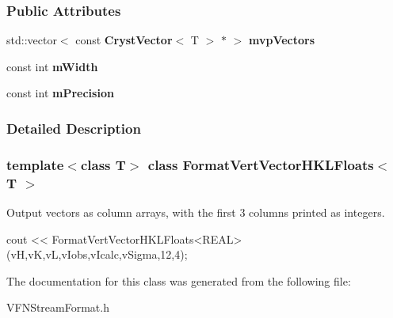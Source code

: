 \subsubsection*{Public Attributes}
\begin{DoxyCompactItemize}
\item 
std::vector$<$ const {\bf CrystVector}$<$ T $>$ $\ast$ $>$ {\bfseries mvpVectors}\label{a00033_adf1d4ac745168890122eb8258a15d2c7}

\item 
const int {\bfseries mWidth}\label{a00033_a47d65c09249a2efaacfc37c490f25115}

\item 
const int {\bfseries mPrecision}\label{a00033_a82aa77621492dcd761a755c9d707cb9e}

\end{DoxyCompactItemize}


\subsubsection{Detailed Description}
\subsubsection*{template$<$class T$>$ class FormatVertVectorHKLFloats$<$ T $>$}

Output vectors as column arrays, with the first 3 columns printed as integers. 
\begin{DoxyCode}
 cout << FormatVertVectorHKLFloats<REAL>(vH,vK,vL,vIobs,vIcalc,vSigma,12,4);
\end{DoxyCode}
 

The documentation for this class was generated from the following file:\begin{DoxyCompactItemize}
\item 
VFNStreamFormat.h\end{DoxyCompactItemize}
